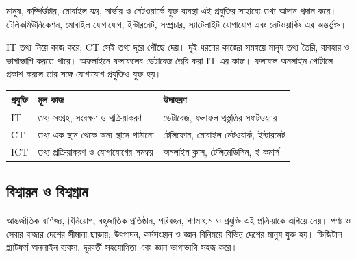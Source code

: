 \begin{topicbody}
মানুষ, কম্পিউটার, মোবাইল যন্ত্র, সার্ভার ও নেটওয়ার্কে যুক্ত ব্যবস্থা এই প্রযুক্তির সাহায্যে তথ্য আদান-প্রদান করে। টেলিকমিউনিকেশন, মোবাইল যোগাযোগ, ইন্টারনেট, সম্প্রচার, স্যাটেলাইট যোগাযোগ এবং নেটওয়ার্কিং এর অন্তর্ভুক্ত।

IT তথ্য নিয়ে কাজ করে; CT সেই তথ্য দূরে পৌঁছে দেয়। দুই ধরনের কাজের সমন্বয়ে মানুষ তথ্য তৈরি, ব্যবহার ও ভাগাভাগি করতে পারে। অফলাইনে ফলাফলের ডেটাবেজ তৈরি করা IT-এর কাজ। ফলাফল অনলাইন পোর্টালে প্রকাশ করলে তার সঙ্গে যোগাযোগ প্রযুক্তিও যুক্ত হয়।
\begin{compacttable}
\begin{tabular}{|p{}|p{}|p{}|}
\hline
\textbf{প্রযুক্তি} & \textbf{মূল কাজ} & \textbf{উদাহরণ}\\\hline
IT & তথ্য সংগ্রহ, সংরক্ষণ ও প্রক্রিয়াকরণ & ডেটাবেজ, ফলাফল প্রস্তুতির সফটওয়্যার\\\hline
CT & তথ্য এক স্থান থেকে অন্য স্থানে পাঠানো & টেলিফোন, মোবাইল নেটওয়ার্ক, ইন্টারনেট\\\hline
ICT & তথ্য প্রক্রিয়াকরণ ও যোগাযোগের সমন্বয় & অনলাইন ক্লাস, টেলিমেডিসিন, ই-কমার্স\\\hline
\end{tabular}
\end{compacttable}

\subsection{বিশ্বায়ন ও বিশ্বগ্রাম}
আন্তর্জাতিক বাণিজ্য, বিনিয়োগ, বহুজাতিক প্রতিষ্ঠান, পরিবহন, গণমাধ্যম ও প্রযুক্তি এই প্রক্রিয়াকে এগিয়ে নেয়। পণ্য ও সেবার বাজার দেশের সীমানা ছাড়ায়; উৎপাদন, কর্মসংস্থান ও জ্ঞান বিনিময়ে বিভিন্ন দেশের মানুষ যুক্ত হয়। ডিজিটাল প্ল্যাটফর্ম অনলাইন ব্যবসা, দূরবর্তী সহযোগিতা এবং জ্ঞান ভাগাভাগি সহজ করে।


\end{topicbody}
